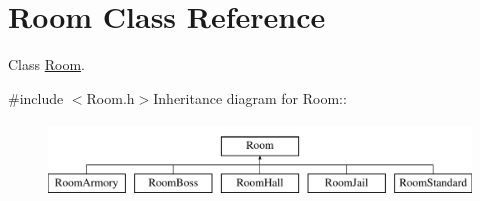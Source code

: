 \hypertarget{classRoom}{
\section{Room Class Reference}
\label{classRoom}
}


Class \hyperlink{classRoom}{Room}.  


{\ttfamily \#include $<$Room.h$>$}Inheritance diagram for Room::\begin{figure}[H]
\begin{center}
\leavevmode
\includegraphics[height=2cm]{classRoom}
\end{center}
\end{figure}
